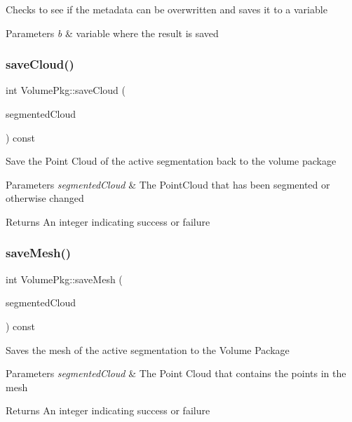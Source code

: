 Checks to see if the metadata can be overwritten and saves it to a variable 
\begin{DoxyParams}{Parameters}
{\em b} & variable where the result is saved \\
\hline
\end{DoxyParams}
\hypertarget{classVolumePkg_ad8e7c0e7bf2ae1b6771533fe60e91625}{}\label{classVolumePkg_ad8e7c0e7bf2ae1b6771533fe60e91625} 
\subsubsection{\texorpdfstring{save\+Cloud()}{saveCloud()}}
{\footnotesize\ttfamily int Volume\+Pkg\+::save\+Cloud (\begin{DoxyParamCaption}\item[{const volcart\+::\+Ordered\+Point\+Set$<$ volcart\+::\+Point3d $>$ \&}]{segmented\+Cloud }\end{DoxyParamCaption}) const}

Save the Point Cloud of the active segmentation back to the volume package 
\begin{DoxyParams}{Parameters}
{\em segmented\+Cloud} & The Point\+Cloud that has been segmented or otherwise changed \\
\hline
\end{DoxyParams}
\begin{DoxyReturn}{Returns}
An integer indicating success or failure 
\end{DoxyReturn}
\hypertarget{classVolumePkg_a8b8474853f26ef0c08cd37ded220c344}{}\label{classVolumePkg_a8b8474853f26ef0c08cd37ded220c344} 
\subsubsection{\texorpdfstring{save\+Mesh()}{saveMesh()}\hspace{0.1cm}{\footnotesize\ttfamily [1/2]}}
{\footnotesize\ttfamily int Volume\+Pkg\+::save\+Mesh (\begin{DoxyParamCaption}\item[{const volcart\+::\+Ordered\+Point\+Set$<$ volcart\+::\+Point3d $>$ \&}]{segmented\+Cloud }\end{DoxyParamCaption}) const}

Saves the mesh of the active segmentation to the Volume Package 
\begin{DoxyParams}{Parameters}
{\em segmented\+Cloud} & The Point Cloud that contains the points in the mesh \\
\hline
\end{DoxyParams}
\begin{DoxyReturn}{Returns}
An integer indicating success or failure 
\end{DoxyReturn}
\hypertarget{classVolumePkg_acd9f9d44b478d8d828de4f364983a5f0}{}\label{classVolumePkg_acd9f9d44b478d8d828de4f364983a5f0} 
